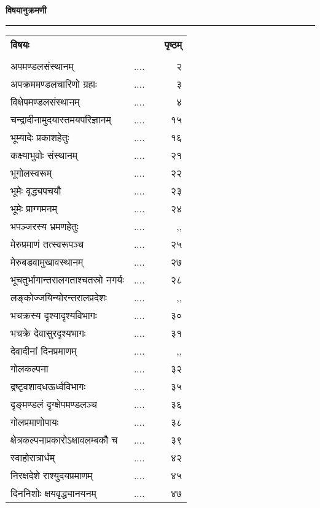 \documentclass[11pt, openany]{book}
\begin{document}
\newpage
\thispagestyle{empty}
\begin{center}
\textbf{विषयानुक्रमणी} \\
\rule{0.08\linewidth}{0.3pt}\end{center} 
\renewcommand{\arraystretch}{1.25}

\begin{tabular}{lp{2cm}p{1cm}r}
  \hspace{1cm} \textbf{विषयः} &&& \textbf{पृष्ठम्} \\
&&&\\
अपमण्डलसंस्थानम् & ....&& २\\
अपक्रममण्डलचारिणो ग्रहाः &.... &&३\\
विक्षेपमण्डलसंस्थानम् &....& &४\\
चन्द्रादीनामुदयास्तमयपरिज्ञानम् &....& &१५\\
भूम्यादेः प्रकाशहेतुः &....&& १६\\
कक्ष्याभुवोः संस्थानम् &....& &२१\\
भूगोलस्वरूम् &....&& २२\\
भूमेः वृद्ध्यपचयौ &.... &&२३\\
भूमेः प्राग्गमनम् &....&& २४\\ 
भपञ्जरस्य भ्रमणहेतुः &.... &&,,\\
मेरुप्रमाणं तत्स्वरूपञ्च& ....&& २५\\
मेरुबडवामुखावस्थानम् &....&& २७\\
भूचतुर्भागान्तरालगताश्चतस्रो नगर्यः &....&& २८\\
लङ्कोज्जयिन्योरन्तरालप्रदेशः &.... &&,,\\
भचक्रस्य दृश्यादृश्यविभागः &....&& ३०\\
भचक्रे देवासुरदृश्यभागः &....&& ३१\\
देवादीनां दिनप्रमाणम् &.... &&,,\\
गोलकल्पना &....&& ३२\\
द्रष्टृवशादधऊर्ध्वविभागः &....&& ३५\\
दृङ्मण्डलं दृग्क्षेपमण्डलञ्च & ....&& ३६\\
गोलप्रमाणोपायः &....&& ३८\\
क्षेत्रकल्पनाप्रकारोऽक्षावलम्बकौ च &....&& ३९\\
स्वाहोरात्रार्धम् &....&& ४२\\
निरक्षदेशे राश्युदयप्रमाणम् &....&& ४५\\
दिननिशोः क्षयवृद्ध्यानयनम् &....&& ४७\\
 \end{tabular}
\end{document}
